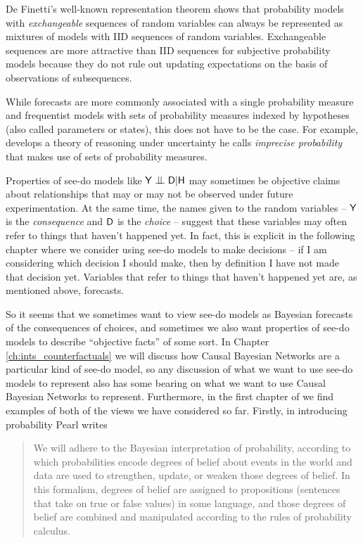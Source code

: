 De Finetti's well-known representation theorem shows that probability models with \emph{exchangeable} sequences of random variables can always be represented as mixtures of models with IID sequences of random variables. Exchangeable sequences are more attractive than IID sequences for subjective probability models because they do not rule out updating expectations on the basis of observations of subsequences.

While forecasts are more commonly associated with a single probability measure and frequentist models with sets of probability measures indexed by hypotheses (also called parameters or states), this does not have to be the case. For example, \citet{walley_statistical_1991} develops a theory of reasoning under uncertainty he calls \emph{imprecise probability} that makes use of sets of probability measures.

Properties of see-do models like $\RV{Y}\CI\RV{D}|\RV{H}$ may sometimes be objective claims about relationships that may or may not be observed under future experimentation. At the same time, the names given to the random variables -- $\mathsf{Y}$ is the \emph{consequence} and $\mathsf{D}$ is the \emph{choice} -- suggest that these variables may often refer to things that haven't happened yet. In fact, this is explicit in the following chapter where we consider using see-do models to make decisions -- if I am considering which decision I should make, then by definition I have not made that decision yet. Variables that refer to things that haven't happened yet are, as mentioned above, forecasts.

So it seems that we sometimes want to view see-do models as Bayesian forecasts of the consequences of choices, and sometimes we also want properties of see-do models to describe ``objective facts'' of some sort. In Chapter \ref{ch:ints_counterfactuals} we will discuss how Causal Bayesian Networks are a particular kind of see-do model, so any discussion of what we want to use see-do models to represent also has some bearing on what we want to use Causal Bayesian Networks to represent. Furthermore, in the first chapter of \citet{pearl_causality:_2009} we find examples of both of the views we have considered so far. Firstly, in introducing probability Pearl writes

\begin{quote}
We will adhere to the Bayesian interpretation of probability, according to which probabilities encode degrees of belief about events in the world and data are used to strengthen, update, or weaken those degrees of belief. In this formalism, degrees of belief are assigned to propositions (sentences that take on true or false values) in some language, and those degrees of belief are combined and manipulated according to the rules of probability calculus.
\end{quote}

